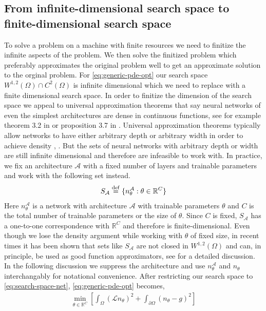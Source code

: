 \subsection{From infinite-dimensional search space to finite-dimensional search space}\label{ssec-infinite-to-finite} To solve a problem on a machine with finite resources we need to finitize the infinite aspects of the problem. We then solve the finitized problem which preferably approximates the original problem well to get an approximate solution to the orginal problem. For \eqref{eq:generic-pde-opt} our search space $W^{1,2}(\Omega)\cap  C^2(\Omega)$ is infinite dimensional which we need to replace with a finite dimensional search space.
In order to finitize the dimension of the search space we appeal to universal approximation theorems that say neural networks of even the simplest architectures are dense in continuous functions, see for example theorem 3.2 in \cite{kidger2020universal} or proposition 3.7 in \cite{pinkus1999approximation}. Universal approximation theorems typically allow networks to have either arbitrary depth or arbitrary width in order to achieve density \cite{pinkus1999approximation}, \cite{de2021approximation}. But the sets of neural networks with arbitrary depth or width are still infinite dimensional and therefore are infeasible to work with. In practice, we fix an architecture $\mathcal A$ with a fixed number of layers and trainable parameters and work with the following set instead.
\begin{align}
    S_{\mathcal A}\stackrel{\rm def}{=}\{n^{\mathcal A}_\theta: \theta\in \mathbb R^C\}\label{eq:search-space-net}
\end{align}
Here $n^{\mathcal A}_\theta$ is a network with architecture $\mathcal A$ with trainable parameters $\theta$ and $C$ is the total number of trainable parameters or the size of $\theta$. Since $C$ is fixed, $S_{\mathcal A}$ has a one-to-one correspondence with $\mathbb R^C$ and therefore is finite-dimensional. Even though we lose the density argument while working with $\theta$ of fixed size, in recent times it has been shown that sets like $S_\mathcal A$ are not closed in $W^{1, 2}(\Omega)$ and can, in principle, be used as good function approximators, see \cite{mahan2021nonclosedness} for a detailed discussion. In the following discussion we suppress the architecture and use $n^{\mathcal A}_\theta$ and $n_\theta$ interchangably for notational convenience. After restricting our search space to \eqref{eq:search-space-net},  \eqref{eq:generic-pde-opt} becomes,
\begin{align}
    \min_{\theta\in\mathbb R^C}\left[\int_{\Omega} (\mathcal L n_\theta)^2 + \int_{\partial\Omega}(n_\theta-g)^2\right]\label{eq:generic-pde-opt-theta}
\end{align}

